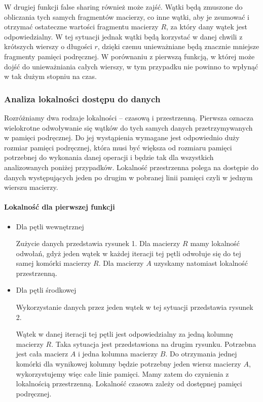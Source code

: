 \documentclass{article}
\begin{document}
W drugiej funkcji false sharing również może zajść. Wątki będą zmuszone do obliczania tych samych fragmentów macierzy, co inne wątki, aby je zsumować i otrzymać ostateczne wartości fragmentu macierzy $R$, za który dany wątek jest odpowiedzialny. W tej sytuacji jednak wątki będą korzystać w danej chwili z krótszych wierszy o długości $r$, dzięki czemu unieważniane będą znacznie mniejsze fragmenty pamięci podręcznej. W porównaniu z pierwszą funkcją, w której może dojść do unieważniania całych wierszy, w tym przypadku nie powinno to wpłynąć w tak dużym stopniu na czas. 

\subsubsection{Analiza lokalności dostępu do danych}

Rozróżniamy dwa rodzaje lokalności -- czasową i przestrzenną. Pierwsza oznacza wielokrotne odwoływanie się wątków do tych samych danych przetrzymywanych w pamięci podręcznej. Do jej wystąpienia wymagane jest odpowiednio duży rozmiar pamięci podręcznej, która musi być większa od rozmiaru pamięci potrzebnej do wykonania danej operacji i będzie tak dla wszystkich analizowanych poniżej przypadków. Lokalność przestrzenna polega na dostępie do danych występujących jeden po drugim w pobranej linii pamięci czyli w jednym wierszu macierzy.

\paragraph{Lokalność dla pierwszej funkcji}

\begin{itemize}

\item Dla pętli wewnętrznej

Zużycie danych przedstawia rysunek 1. Dla macierzy $R$ mamy lokalność odwołań, gdyż jeden wątek w każdej iteracji tej pętli odwołuje się do tej samej komórki macierzy $R$. Dla macierzy $A$ uzyskamy natomiast lokalność przestrzenną.

\item Dla pętli środkowej

Wykorzystanie danych przez jeden wątek w tej sytuacji przedstawia rysunek 2. 

Wątek w danej iteracji tej pętli jest odpowiedzialny za jedną kolumnę macierzy $R$. Taka sytuacja jest przedstawiona na drugim rysunku. Potrzebna jest cała macierz $A$ i jedna kolumna macierzy $B$. Do otrzymania jednej komórki dla wynikowej kolumny będzie potrzebny jeden wiersz macierzy $A$, wykorzystujemy więc całe linie pamięci. Mamy zatem do czynienia z lokalnością przestrzenną. Lokalność czasowa zależy od dostępnej pamięci podręcznej.

\end{itemize}
\end{document}
